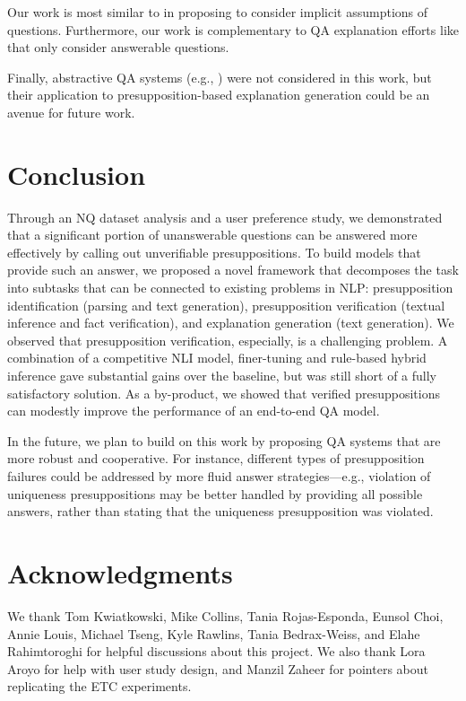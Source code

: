 \documentclass[11pt,a4paper]{article}
\begin{document}
Our work is most similar to \citet{geva2021did} in proposing to consider implicit assumptions of questions. Furthermore, our work is complementary to QA explanation efforts like \citet{lamm2020qed} that only consider answerable questions. 

Finally, abstractive QA systems (e.g., \citealt{fan2019eli5}) were not considered in this work, but their application to presupposition-based explanation generation could be an avenue for future work.

\section{Conclusion}
 Through an NQ dataset analysis and a user preference study, we demonstrated that a significant portion of unanswerable questions can be answered more effectively by calling out unverifiable presuppositions. To build models that provide such an answer, we proposed a novel framework that decomposes the task into subtasks that can be connected to existing problems in NLP: presupposition identification (parsing and text generation), presupposition verification (textual inference and fact verification), and explanation generation (text generation). We observed that presupposition verification, especially, is a challenging problem. A combination of a competitive NLI model, finer-tuning and rule-based hybrid inference gave substantial gains over the baseline, but was still short of a fully satisfactory solution. As a by-product, we showed that verified presuppositions can modestly improve the performance of an end-to-end QA model.  

In the future, we plan to build on this work by proposing QA systems that are more robust and cooperative. For instance, different types of presupposition failures could be addressed by more fluid answer strategies---e.g., violation of uniqueness presuppositions may be better handled by providing all possible answers, rather than stating that the uniqueness presupposition was violated. 

\section*{Acknowledgments}
We thank Tom Kwiatkowski, Mike Collins, Tania Rojas-Esponda, Eunsol Choi, Annie Louis, Michael Tseng, Kyle Rawlins, Tania Bedrax-Weiss, and Elahe Rahimtoroghi for helpful discussions about this project. We also thank Lora Aroyo for help with user study design, and Manzil Zaheer for pointers about replicating the ETC experiments.
\end{document}

